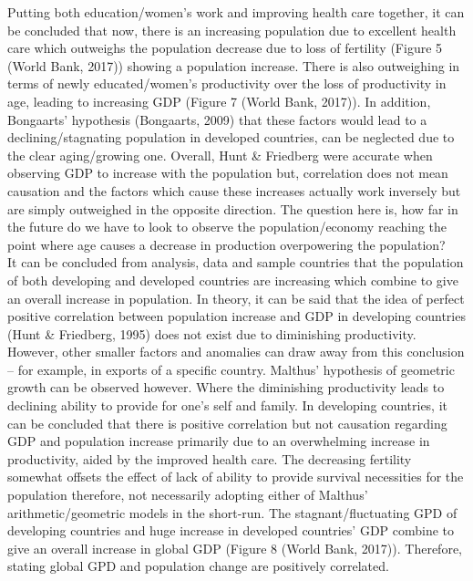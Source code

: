 \documentclass[11pt, english]{article}
\begin{document}
	Putting both education/women’s work and improving health care together, it can be concluded that now, there is an increasing population due to excellent health care which outweighs the population decrease due to loss of fertility (Figure 5 (World Bank, 2017)) showing a population increase. There is also outweighing in terms of newly educated/women’s productivity over the loss of productivity in age, leading to increasing GDP (Figure 7 (World Bank, 2017)). In addition, Bongaarts’ hypothesis (Bongaarts, 2009) that these factors would lead to a declining/stagnating population in developed countries, can be neglected due to the clear aging/growing one. Overall, Hunt \& Friedberg were accurate when observing GDP to increase with the population but, correlation does not mean causation and the factors which cause these increases actually work inversely but are simply outweighed in the opposite direction. The question here is, how far in the future do we have to look to observe the population/economy reaching the point where age causes a decrease in production overpowering the population?\\

	It can be concluded from analysis, data and sample countries that the population of both developing and developed countries are increasing which combine to give an overall increase in population. In theory, it can be said that the idea of perfect positive correlation between population increase and GDP in developing countries (Hunt \& Friedberg, 1995) does not exist due to diminishing productivity. However, other smaller factors and anomalies can draw away from this conclusion – for example, in exports of a specific country. Malthus’ hypothesis of geometric growth can be observed however. Where the diminishing productivity leads to declining ability to provide for one’s self and family. In developing countries, it can be concluded that there is positive correlation but not causation regarding GDP and population increase primarily due to an overwhelming increase in productivity, aided by the improved health care. The decreasing fertility somewhat offsets the effect of lack of ability to provide survival necessities for the population therefore, not necessarily adopting either of Malthus’ arithmetic/geometric models in the short-run. The stagnant/fluctuating GPD of developing countries and huge increase in developed countries’ GDP combine to give an overall increase in global GDP (Figure 8 (World Bank, 2017)). Therefore, stating global GPD and population change are positively correlated.
\end{document}
